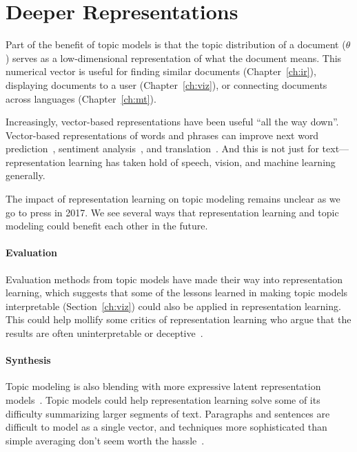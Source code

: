 \section{Deeper Representations}

Part of the benefit of topic models is that the topic distribution of
a document ($\theta$) serves as a low-dimensional representation of
what the document means.  This numerical vector is useful for finding
similar documents (Chapter~\ref{ch:ir}), displaying documents to a user
(Chapter~\ref{ch:viz}), or connecting documents across languages
(Chapter~\ref{ch:mt}).

Increasingly, vector-based representations have been useful ``all the
way down''.  Vector-based representations of words and phrases can
improve next word prediction~\citep{bengio-03}, sentiment
analysis~\citep{socher-12}, and translation~\citep{devlin-14}.  And
this is not just for text---representation learning has taken hold of
speech, vision, and machine learning generally.

The impact of representation learning on topic modeling remains
unclear as we go to press in 2017.  We see several ways that
representation learning and topic modeling could benefit each other in
the future.

\paragraph{Evaluation}

Evaluation methods from topic models have made their way into
representation learning, which suggests that some of the lessons
learned in making topic models interpretable (Section~\ref{ch:viz}) could
also be applied in representation learning.  This could help mollify
some critics of representation learning who argue that the results are
often uninterpretable or deceptive~\citep{szegedy-13}.

\paragraph{Synthesis}

Topic modeling is also blending with more expressive latent
representation models~\citep{ranganath-15}.  Topic models could help
representation learning solve some of its difficulty summarizing
larger segments of text.  Paragraphs and sentences are difficult to
model as a single vector, and techniques more sophisticated than
simple averaging don't seem worth the hassle~\citep{iyyer-15}.

